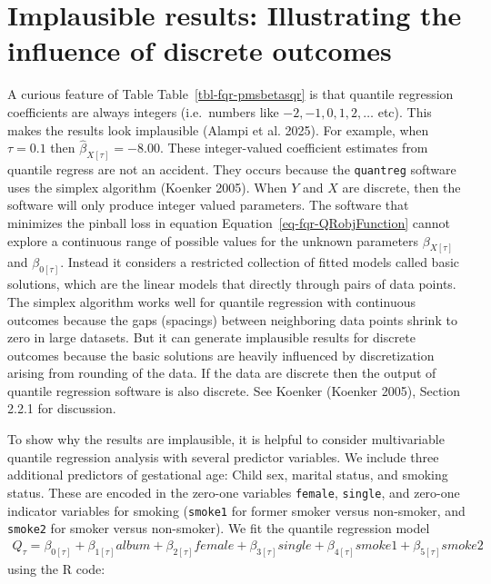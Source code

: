 \documentclass[
  letterpaper,
  DIV=11,
  numbers=noendperiod]{scrartcl}
\begin{document}
\section{Implausible results: Illustrating the influence of discrete
outcomes}\label{implausible-results-illustrating-the-influence-of-discrete-outcomes}

A curious feature of Table Table~\ref{tbl-fqr-pmsbetasqr} is that
quantile regression coefficients are always integers (i.e.~numbers like
\(-2,-1, 0, 1, 2, \dots\) etc). This makes the results look implausible
(Alampi et al. 2025). For example, when \(\tau=0.1\) then
\(\hat{\beta}_{X [\tau]} = -8.00\). These integer-valued coefficient
estimates from quantile regress are not an accident. They occurs because
the \texttt{quantreg} software uses the simplex algorithm (Koenker
2005). When \(Y\) and \(X\) are discrete, then the software will only
produce integer valued parameters. The software that minimizes the
pinball loss in equation Equation~\ref{eq-fqr-QRobjFunction} cannot
explore a continuous range of possible values for the unknown parameters
\(\beta_{X [\tau]}\) and \(\beta_{0 [\tau]}\). Instead it considers a
restricted collection of fitted models called basic solutions, which are
the linear models that directly through pairs of data points. The
simplex algorithm works well for quantile regression with continuous
outcomes because the gaps (spacings) between neighboring data points
shrink to zero in large datasets. But it can generate implausible
results for discrete outcomes because the basic solutions are heavily
influenced by discretization arising from rounding of the data. If the
data are discrete then the output of quantile regression software is
also discrete. See Koenker (Koenker 2005), Section 2.2.1 for discussion.

To show why the results are implausible, it is helpful to consider
multivariable quantile regression analysis with several predictor
variables. We include three additional predictors of gestational age:
Child sex, marital status, and smoking status. These are encoded in the
zero-one variables \texttt{female}, \texttt{single}, and zero-one
indicator variables for smoking (\texttt{smoke1} for former smoker
versus non-smoker, and \texttt{smoke2} for smoker versus non-smoker). We
fit the quantile regression model \[\begin{aligned}
Q_{\tau} = \beta_{0 [\tau]} + \beta_{1 [\tau]} album + \beta_{2 [\tau]} female + \beta_{3 [\tau]} single +\beta_{4 [\tau]} smoke1 + \beta_{5 [\tau]} smoke2\label{eq-fqr-qrmodel.mlr}
\end{aligned}\] using the R code:
\end{document}
